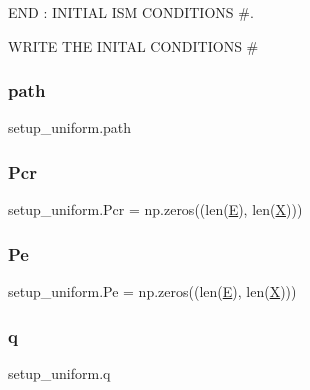 E\+ND \+: I\+N\+I\+T\+I\+AL I\+SM C\+O\+N\+D\+I\+T\+I\+O\+NS \#. 

W\+R\+I\+TE T\+HE I\+N\+I\+T\+AL C\+O\+N\+D\+I\+T\+I\+O\+NS \# \mbox{\label{namespacesetup__uniform_a2a320d2464e99d040b5963c189c187d4}} 
\subsubsection{\texorpdfstring{path}{path}}
{\footnotesize\ttfamily setup\+\_\+uniform.\+path}

\mbox{\label{namespacesetup__uniform_a2e561d5e51c4c935824e46f963efc9bd}} 
\subsubsection{\texorpdfstring{Pcr}{Pcr}}
{\footnotesize\ttfamily setup\+\_\+uniform.\+Pcr = np.\+zeros((len(\hyperlink{namespacesetup__uniform_a05accd2e8ab1c28d2f58f024c9a64fac}{E}), len(\hyperlink{namespacesetup__uniform_a6d0e53624e475055c31146a2ff8d762c}{X})))}

\mbox{\label{namespacesetup__uniform_a9060abfe0bb5708e0e094fdf8c1e0d28}} 
\subsubsection{\texorpdfstring{Pe}{Pe}}
{\footnotesize\ttfamily setup\+\_\+uniform.\+Pe = np.\+zeros((len(\hyperlink{namespacesetup__uniform_a05accd2e8ab1c28d2f58f024c9a64fac}{E}), len(\hyperlink{namespacesetup__uniform_a6d0e53624e475055c31146a2ff8d762c}{X})))}

\mbox{\label{namespacesetup__uniform_ae1faae778cf37a4bc2acee98ac45904d}} 
\subsubsection{\texorpdfstring{q}{q}}
{\footnotesize\ttfamily setup\+\_\+uniform.\+q}


